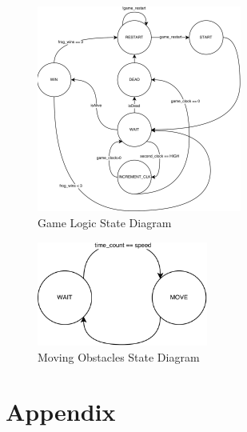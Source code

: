 \documentclass[journal, twocolumn, final,11pt,letterpaper]{IEEEtran}
\begin{document}
\begin{figure}[H]
	\centering
	\includegraphics[width=0.6\textwidth]{game_logic_state_diagram.png}
	\caption{Game Logic State Diagram}
	\label{fig:game-logic-state-diagram}

\end{figure}

\begin{figure}[H]
	\centering
	\includegraphics[width=0.5\textwidth]{moving_state.png}
	\caption{Moving Obstacles State Diagram}
	\label{fig:moving-state}
\end{figure}


\section*{Appendix}




%
%     
\end{document}
